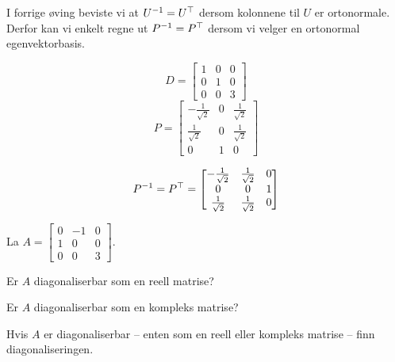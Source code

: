 \begin{losning}
\begin{punkt}
I forrige øving beviste vi at $U^{-1}=U^\top$ dersom kolonnene til $U$ er ortonormale. Derfor kan vi enkelt regne ut $P^{-1}=P^\top$ dersom vi velger en ortonormal egenvektorbasis. 
\end{punkt}

\begin{punkt}
$$D=\begin{bmatrix}
1 & 0 & 0\\
0 & 1 & 0\\
0 & 0 & 3
\end{bmatrix}$$ $$P=\begin{bmatrix}
-\frac{1}{\sqrt{2}} & 0 & \frac{1}{\sqrt{2}}\\
\frac{1}{\sqrt{2}} & 0 & \frac{1}{\sqrt{2}}\\
0 & 1 & 0
\end{bmatrix}$$

$$P^{-1}=P^\top=\begin{bmatrix}
-\frac{1}{\sqrt{2}} & \frac{1}{\sqrt{2}} & 0\\
0 & 0 & 1\\
\frac{1}{\sqrt{2}} & \frac{1}{\sqrt{2}} & 0
\end{bmatrix}$$
\end{punkt}

\end{losning}

\begin{oppgave}
La $A=\begin{bmatrix}
0 & -1 & 0\\
1 & 0 & 0\\
0 & 0 & 3
\end{bmatrix}$.

\begin{punkt}
Er $A$ diagonaliserbar som en reell matrise?
\end{punkt}

\begin{punkt}
Er $A$ diagonaliserbar som en kompleks matrise?
\end{punkt}

\begin{punkt}
Hvis $A$ er diagonaliserbar -- enten som en reell eller kompleks matrise -- finn diagonaliseringen.
\end{punkt}

\end{oppgave}

